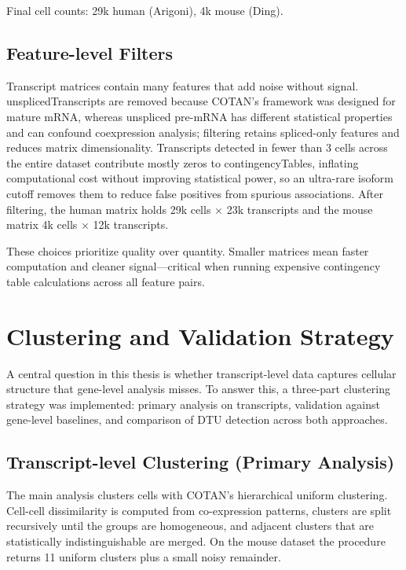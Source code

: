 Final cell counts: 29k human (Arigoni), 4k mouse (Ding).

\subsection*{Feature-level Filters}

Transcript matrices contain many features that add noise without signal. \glspl{unsplicedTranscript} are removed because COTAN's framework\cite{galfre2021cotan} was designed for mature mRNA, whereas unspliced pre-mRNA has different statistical properties and can confound \gls{coexpression} analysis; filtering retains spliced-only features and reduces matrix dimensionality. Transcripts detected in fewer than 3 cells across the entire dataset contribute mostly zeros to \gls{contingencyTable}s, inflating computational cost without improving statistical power, so an ultra-rare isoform cutoff removes them to reduce false positives from spurious associations. After filtering, the human matrix holds 29k cells $\times$ 23k transcripts and the mouse matrix 4k cells $\times$ 12k transcripts.

These choices prioritize quality over quantity. Smaller matrices mean faster computation and cleaner signal---critical when running expensive contingency table calculations across all feature pairs.

\section{Clustering and Validation Strategy}

A central question in this thesis is whether transcript-level data captures cellular structure that gene-level analysis misses. To answer this, a three-part clustering strategy was implemented: primary analysis on transcripts, validation against gene-level baselines, and comparison of DTU detection across both approaches.

\subsection*{Transcript-level Clustering (Primary Analysis)}

The main analysis clusters cells with COTAN's hierarchical uniform clustering. Cell-cell dissimilarity is computed from co-expression patterns, clusters are split recursively until the groups are homogeneous, and adjacent clusters that are statistically indistinguishable are merged. On the mouse dataset the procedure returns 11 uniform clusters plus a small noisy remainder.

